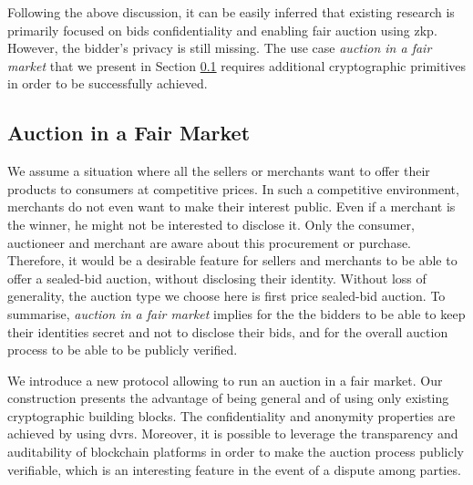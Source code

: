        

Following the above discussion, it can be easily inferred that existing research is primarily focused on bids confidentiality and enabling fair auction using \gls{zkp}. However, the bidder's privacy is still missing. The use case \textit{auction in a fair market} that we present in Section \ref{subsec-usecase} requires additional cryptographic primitives in order to be successfully achieved.

\subsection{Auction in a Fair Market}
\label{subsec-usecase}
We assume a situation where all the sellers or merchants want to offer
their products to consumers at competitive prices. In such a competitive environment, merchants do not even want to make their interest public. Even if a merchant is the winner, he might not be interested to disclose it. Only the consumer, auctioneer and merchant are aware about this procurement or purchase. Therefore, it would be a desirable feature for sellers and merchants to be able to offer a sealed-bid auction, without disclosing their identity. Without loss of generality, the auction type we choose here is first price sealed-bid auction. To summarise, \textit{auction in a fair market} implies for the the bidders to be able to keep their identities secret and not to disclose their bids, and for the overall auction process to be able to be publicly verified.


  We introduce a new protocol allowing to run an auction in a fair market. Our construction presents the advantage of being general and of using only existing cryptographic building blocks. The confidentiality and anonymity properties are achieved by using \gls{dvrs}. Moreover, it is possible to leverage the transparency and auditability of blockchain platforms in order to make the auction process publicly verifiable, which is an interesting feature in the event of a dispute among parties. 

